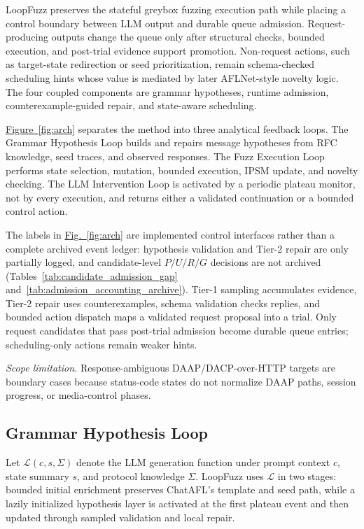 \documentclass[final,5p,times,number]{elsarticle}
\newcommand{\figref}[1]{\hyperref[#1]{Fig.~\ref*{#1}}}
\newcommand{\figureref}[1]{\hyperref[#1]{Figure~\ref*{#1}}}
\begin{document}
LoopFuzz preserves the stateful greybox fuzzing execution path while placing a control boundary between LLM output and durable queue admission. Request-producing outputs change the queue only after structural checks, bounded execution, and post-trial evidence support promotion. Non-request actions, such as target-state redirection or seed prioritization, remain schema-checked scheduling hints whose value is mediated by later AFLNet-style novelty logic. The four coupled components are grammar hypotheses, runtime admission, counterexample-guided repair, and state-aware scheduling.

\figureref{fig:arch} separates the method into three analytical feedback loops. The Grammar Hypothesis Loop builds and repairs message hypotheses from RFC knowledge, seed traces, and observed responses. The Fuzz Execution Loop performs state selection, mutation, bounded execution, IPSM update, and novelty checking. The LLM Intervention Loop is activated by a periodic plateau monitor, not by every execution, and returns either a validated continuation or a bounded control action.

The labels in \figref{fig:arch} are implemented control interfaces rather than a complete archived event ledger: hypothesis validation and Tier-2 repair are only partially logged, and candidate-level $P/U/R/G$ decisions are not archived (Tables~\ref{tab:candidate_admission_gap} and~\ref{tab:admission_accounting_archive}). Tier-1 sampling accumulates evidence, Tier-2 repair uses counterexamples, schema validation checks replies, and bounded action dispatch maps a validated request proposal into a trial. Only request candidates that pass post-trial admission become durable queue entries; scheduling-only actions remain weaker hints.

\emph{Scope limitation.} Response-ambiguous DAAP/DACP-over-HTTP targets are boundary cases because status-code states do not normalize DAAP paths, session progress, or media-control phases.

\subsection{Grammar Hypothesis Loop}
Let $\mathcal{L}(c, s, \Sigma)$ denote the LLM generation function under prompt context $c$, state summary $s$, and protocol knowledge $\Sigma$. LoopFuzz uses $\mathcal{L}$ in two stages: bounded initial enrichment preserves ChatAFL's template and seed path, while a lazily initialized hypothesis layer is activated at the first plateau event and then updated through sampled validation and local repair.
\end{document}
